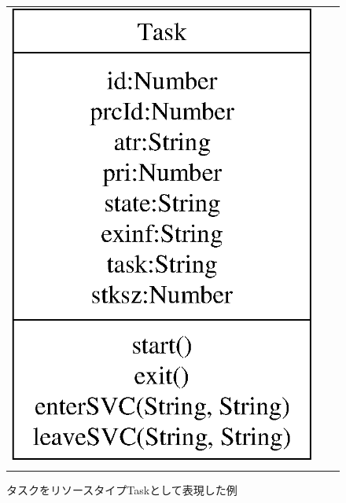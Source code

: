 \begin{figure}[h]
\begin{tabular}{ccc}
\begin{minipage}{0.35\hsize}
\begin{center}
\includegraphics[scale=0.5]{img/resourceTypeSampleByTask.eps}
\caption{タスクをリソースタイプTaskとして表現した例}
\label{fig:resourceTypeSampleByTask}
\end{center}
\end{minipage}
\begin{minipage}{0.25\hsize}
\mbox{}\\
\end{minipage}
\begin{minipage}{0.3\hsize}
\begin{center}

\end{center}
\end{minipage}
\end{tabular}
\end{figure}
